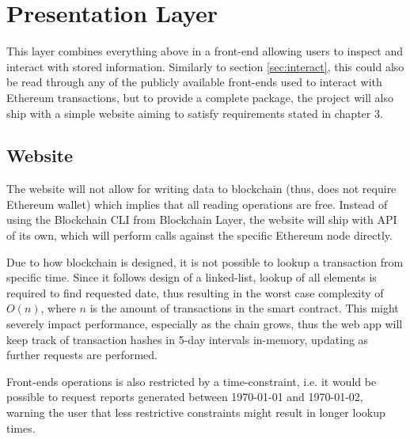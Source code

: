 \section{Presentation Layer}
This layer combines everything above in a front-end allowing users to inspect and interact with stored information. Similarly to section \ref{sec:interact}, this could also be read through any of the publicly available front-ends used to interact with Ethereum transactions, but to provide a complete package, the project will also ship with a simple website aiming to satisfy requirements stated in chapter 3.
\subsection{Website}
The website will not allow for writing data to blockchain (thus, does not require Ethereum wallet) which implies that all reading operations are free. Instead of using the Blockchain CLI from Blockchain Layer, the website will ship with API of its own, which will perform calls against the specific Ethereum node directly.

Due to how blockchain is designed, it is not possible to lookup a transaction from specific time. Since it follows design of a linked-list, lookup of all elements is required to find requested date, thus resulting in the worst case complexity of $O(n)$, where $n$ is the amount of transactions in the smart contract. This might severely impact performance, especially as the chain grows, thus the web app will keep track of transaction hashes in 5-day intervals in-memory, updating as further requests are performed.

Front-ends operations is also restricted by a time-constraint, i.e. it would be possible to request reports generated between 1970-01-01 and 1970-01-02, warning the user that less restrictive constraints might result in longer lookup times.

